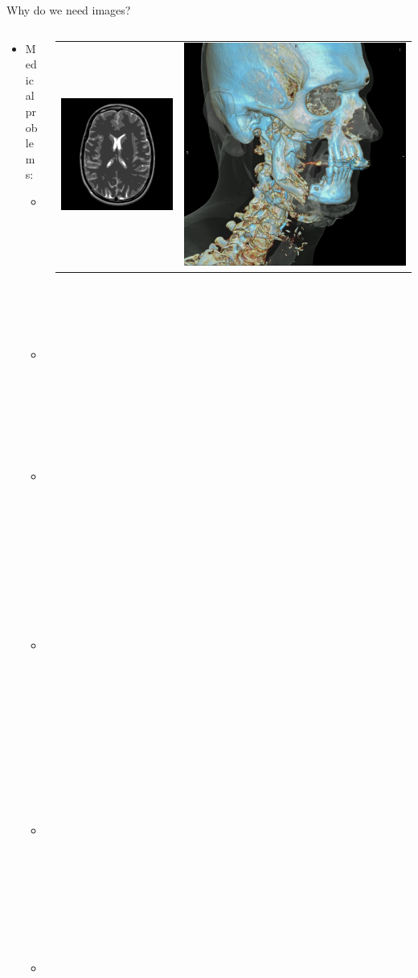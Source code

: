 \begin{frame}[c]{Why do we need images?}

	\begin{columns}[c]
		\begin{column}{0.4\textwidth}

			\begin{itemize}
				\item Medical problems:
				      \begin{itemize}
					      \item fracture?
					      \item lesion?
					      \item perfusion?
					      \item metabolism?
					      \item atrophy?
					      \item and much more
				      \end{itemize}
			\end{itemize}
		\end{column}\begin{column}{0.5\textwidth}
			\begin{tabular}{cc}
				\includegraphics[width=.45\textwidth]{images/parallel_full.png}                                                               & \includegraphics[width=.45\textwidth]{images/155_13.jpg} \\

\end{tabular}
\end{column}
\end{columns}
\end{frame}

